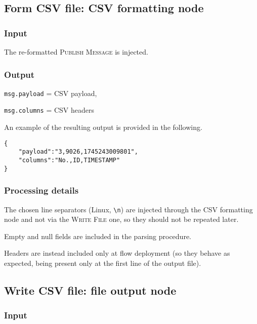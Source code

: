 \documentclass[a4paper,11pt]{article} %
\begin{document}
    \subsection{Form CSV file: CSV formatting node}\label{subsec:form-csv-file:-csv-formatting-node}

    \subsubsection{Input}

    The re-formatted \textsc{Publish Message} is injected.

    \subsubsection{Output}

    \texttt{msg.payload} = CSV payload,

    \texttt{msg.columns} = CSV headers

    \medskip

    An example of the resulting output is provided in the following.

    \begin{verbatim}
{
    "payload":"3,9026,1745243009801",
    "columns":"No.,ID,TIMESTAMP"
}
    \end{verbatim}

    \subsubsection{Processing details}

    The chosen line separators (Linux, \texttt{\textbackslash n}) are injected through the CSV formatting node and not via the \textsc{Write File} one, so they should not be repeated later.

    \smallskip

    Empty and null fields are included in the parsing procedure.

    \smallskip

    Headers are instead included only at flow deployment (so they behave as expected, being present only at the first line of the output file).

    \subsection{Write CSV file: file output node}\label{subsec:write-csv-file:-file-output-node}

    \subsubsection{Input}
\end{document}
